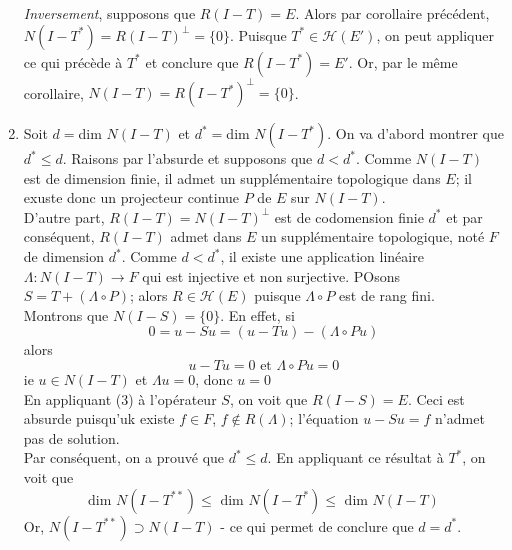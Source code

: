 \begin{dem}
\begin{enumerate}
\bigskip
\textit{Inversement}, supposons que $R(I-T)=E$. Alors par corollaire précédent, $N(I-T^*)=R(I-T)^\perp=\{0\}$. Puisque $T^*\in\mathscr{H}(E')$, on peut appliquer ce qui précède à $T^*$ et conclure que $R(I-T^*)=E'$. Or, par le même corollaire, $N(I-T)=R(I-T^*)^\perp=\{0\}$.

	\item Soit $d=$dim $N(I-T)$ et $d^*=$dim $N(I-T^*)$. On va d'abord montrer que $d^*\leq d$. Raisons par l'absurde et supposons que $d<d^*$. Comme $N(I-T)$ est de dimension finie, il admet un supplémentaire topologique dans $E$; il exuste donc un projecteur continue $P$ de $E$ sur $N(I-T)$.\\
D'autre part, $R(I-T)=N(I-T)^\perp$ est de codomension finie $d^*$ et par conséquent, $R(I-T)$ admet dans $E$ un supplémentaire topologique, noté $F$ de dimension $d^*$. Comme $d<d^*$, il existe une application linéaire $\Lambda:N(I-T)\to F$ qui est injective et non surjective. POsons $S=T+(\Lambda\circ P)$; alors $R\in\mathscr{H}(E)$ puisque $\Lambda\circ P$ est de rang fini.\\
Montrons que $N(I-S)=\{0\}$. En effet, si \[0=u-Su=(u-Tu)-(\Lambda\circ Pu)\]
alors \[u-Tu=0 \text{ et } \Lambda\circ Pu=0\]
ie $u\in N(I-T)$ et $\Lambda u=0$, donc $u=0$\\
En appliquant (3) à l'opérateur $S$, on voit que $R(I-S)=E$. Ceci est absurde puisqu'uk existe $f\in F$, $f\not\in R(\Lambda)$; l'équation $u-Su=f$ n'admet pas de solution.\\
Par conséquent, on a prouvé que $d^*\leq d$. En appliquant ce résultat à $T^*$, on voit que \[\text{dim }N(I-T^{**})\leq \text{ dim }N(I-T^*)\leq \text{ dim }N(I-T)\]
Or, $N(I-T^{**})\supset N(I-T)$ - ce qui permet de conclure que $d=d^*$.
\end{enumerate}
\end{dem}


